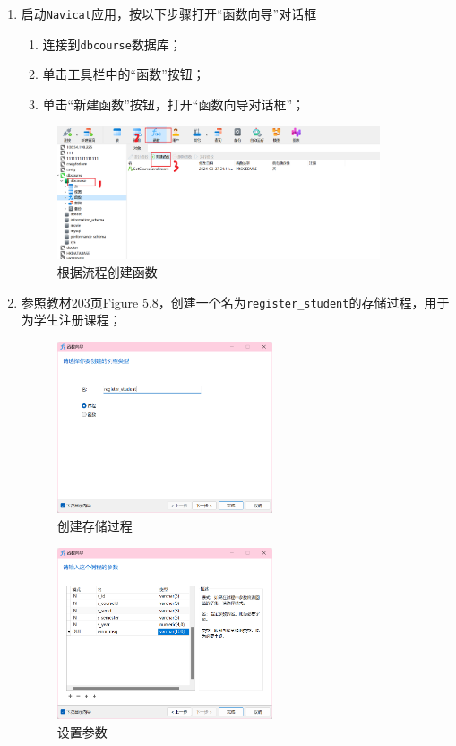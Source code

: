 \documentclass{article}
\renewcommand\tt{\texttt}
\begin{document}
\begin{enumerate}
  \item 启动\texttt{Navicat}应用，按以下步骤打开“函数向导”对话框
        \begin{enumerate}
          \item 连接到\tt{dbcourse}数据库；
          \item 单击工具栏中的“函数”按钮；
          \item 单击“新建函数”按钮，打开“函数向导对话框”；
        \end{enumerate}

        \begin{figure}[H]
          \centering
          \includegraphics[width=0.9\textwidth]{img/9.png}
          \caption{根据流程创建函数}
        \end{figure}

  \item 参照教材203页Figure 5.8，创建一个名为\tt{register\_student}的存储过程，用于为学生注册课程；

        \begin{figure}[H]
          \centering
          \includegraphics[width=0.6\textwidth]{img/10.png}
          \caption{创建存储过程}
        \end{figure}

        \begin{figure}[H]
          \centering
          \includegraphics[width=0.6\textwidth]{img/11.png}
          \caption{设置参数}
        \end{figure}


\end{enumerate}
\end{document}
